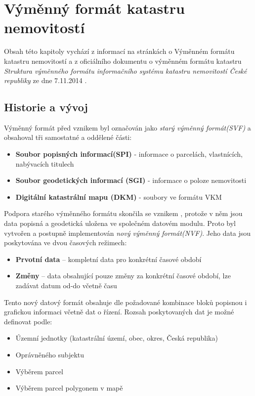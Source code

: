 \section{Výměnný formát katastru nemovitostí}
Obsah této kapitoly vychází z informací na stránkách  o Výměnném formátu katastru nemovitostí a z oficiálního dokumentu o výměnném formátu katastru \textit{Struktura výměnného formátu informačního systému katastru nemovitostí České republiky} ze dne 7.11.2014 \cite{struktura_ISKN}.
\subsection{Historie a vývoj}
Výměnný formát před vznikem  byl označován jako \textit{starý výměnný formát(SVF)} a obsahoval tři samostatné a oddělené části:
\begin{itemize}[leftmargin=50pt]
	\item \textbf{Soubor popisných informací(SPI)} - informace o parcelách, vlastnících, nabývacích titulech
	\item \textbf{Soubor geodetických informací (SGI)} - informace o poloze nemovitosti
	\item \textbf{Digitální katastrální mapu (DKM)} - soubory ve formátu VKM
\end{itemize}
Podpora starého výměnného formátu skončila se vznikem , protože v něm jsou data popisná a geodetická uložena ve společném datovém modulu. Proto byl vytvořen a postupně implementován \textit{nový výměnný formát(NVF)}. Jeho data jsou poskytována ve dvou časových režimech:

\begin{itemize}[leftmargin=50pt]
\item \textbf{Prvotní data} -- kompletní data pro konkrétní časové období						
\item \textbf{Změny} -- data obsahující pouze změny za konkrétní časové období, lze zadávat datum od-do včetně času					 
\end{itemize}
Tento nový datový formát obsahuje dle požadované kombinace bloků popisnou i grafickou informaci včetně dat o řízení. Rozsah poskytovaných dat je možné definovat podle:

\begin{itemize}[leftmargin=50pt]
		\item Územní jednotky (katastrální území, obec, okres, Česká republika)
		\item Oprávněného subjektu
		\item Výběrem parcel
		\item Výběrem parcel polygonem v mapě
\end{itemize}

